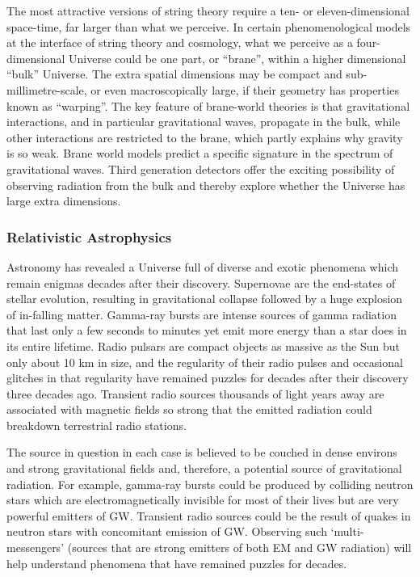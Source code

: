The most attractive versions of string theory require a ten- or
eleven-dimensional space-time, far larger than what we perceive.
In certain phenomenological models at the interface of string
theory and cosmology, what we perceive as a four-dimensional
Universe could be one part, or ``brane'', within a higher
dimensional ``bulk'' Universe. The extra spatial dimensions may
be compact and sub-millimetre-scale,
or even macroscopically large, if their geometry has
properties known as ``warping''. The key feature of brane-world
theories is that gravitational interactions, and in particular
gravitational waves, propagate in the bulk, while other interactions
are restricted to the brane, which partly explains why gravity is
so weak.  Brane world models predict a specific signature in the 
spectrum of gravitational waves. Third generation detectors offer 
the exciting possibility of observing radiation from the bulk and 
thereby explore whether the Universe has large extra dimensions.
\FloatBarrier
\subsubsection{Relativistic Astrophysics}
Astronomy has revealed a Universe full of diverse and exotic
phenomena which remain enigmas decades after their discovery.
Supernovae are the end-states of stellar evolution, resulting in
gravitational collapse followed by a huge explosion of in-falling matter.
Gamma-ray bursts are intense sources of gamma radiation that last
only a few seconds to minutes yet emit more energy than a star does
in its entire lifetime.
Radio pulsars are compact objects as massive as the Sun but only
about 10 km in size, and the regularity of their radio pulses and
occasional glitches in that regularity have remained 
puzzles for decades after their discovery three decades ago.
Transient radio sources thousands of light years away
are associated with magnetic fields so strong that the emitted radiation
could breakdown terrestrial radio stations.

The source in question in each case is believed to be couched in
dense environs and strong gravitational fields and, therefore,
a potential source of gravitational radiation. For example, gamma-ray
bursts could be produced by colliding neutron stars which are
electromagnetically invisible for most of their lives but are very
powerful emitters of GW. Transient radio sources could be the
result of quakes in neutron stars with concomitant emission of GW.
Observing such `multi-messengers' (sources that are strong emitters of
both EM and GW radiation) will help understand phenomena that
have remained puzzles for decades.

